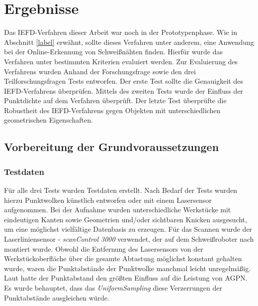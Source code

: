 \chapter{Ergebnisse}
Das IEFD-Verfahren dieser Arbeit war noch in der Prototypenphase. Wie in Abschnitt \ref{label} erwähnt, sollte dieses Verfahren unter anderem, eine Anwendung bei der Online-Erkennung von Schweißnähten finden. Hierfür wurde das Verfahren unter bestimmten Kriterien evaluiert werden. Zur Evaluierung des Verfahrens wurden Anhand der Forschungsfrage sowie den drei Teilforschungsfragen Tests entworfen. Der erste Test sollte die Genauigkeit des IEFD-Verfahrens überprüfen. Mittels des zweiten Tests wurde der Einfluss der Punktdichte auf dem Verfahren überprüft. Der letzte Test überprüfte die Robustheit des IEFD-Verfahrens gegen Objekten mit unterschiedlichen geometrischen Eigenschaften.

\section{Vorbereitung der Grundvoraussetzungen}
\subsection{Testdaten}\label{test_data}
Für alle drei Tests wurden Testdaten erstellt. Nach Bedarf der Tests wurden hierzu Punktwolken künstlich entworfen oder mit einem Lasersensor aufgenommen. Bei der Aufnahme wurden unterschiedliche Werkstücke mit eindeutigen Kanten sowie Geometrien und/oder sichtbaren Knicken ausgesucht, um eine möglichst vielfältige Datenbasis zu erzeugen. Für das Scannen wurde der Laserliniensensor - \textit{scanControl 3000} verwendet, der auf dem Schweißroboter nach \textcite[39]{savla_intelligente_2022} montiert wurde. Obwohl die Entfernung des Lasersensors von der Werkstückoberfläche über die gesamte Abtastung möglichst konstant gehalten wurde, waren die Punktabstände der Punktwolke manchmal leicht unregelmäßig. Laut \textcite[9]{ni_edge_2016} hatte der Punktabstand den größten Einfluss auf die Leistung von AGPN. Es wurde behauptet, dass das \textit{UniformSampling} diese Verzerrungen der Punktabstände ausgleichen würde. 

